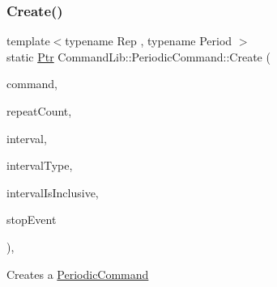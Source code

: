 \subsubsection{\texorpdfstring{Create()}{Create()}\hspace{0.1cm}{\footnotesize\ttfamily [3/4]}}
{\footnotesize\ttfamily template$<$typename Rep , typename Period $>$ \\
static \mbox{\hyperlink{class_command_lib_1_1_command_a3b3e4f00144373299df5c6bb1acc319d}{Ptr}} Command\+Lib\+::\+Periodic\+Command\+::\+Create (\begin{DoxyParamCaption}\item[{\mbox{\hyperlink{class_command_lib_1_1_command_a3b3e4f00144373299df5c6bb1acc319d}{Command\+::\+Ptr}}}]{command,  }\item[{size\+\_\+t}]{repeat\+Count,  }\item[{std\+::chrono\+::duration$<$ Rep, Period $>$}]{interval,  }\item[{\mbox{\hyperlink{class_command_lib_1_1_periodic_command_ac32ef93cf679cd652da30a0ad373d31e}{Interval\+Type}}}]{interval\+Type,  }\item[{bool}]{interval\+Is\+Inclusive,  }\item[{\mbox{\hyperlink{class_command_lib_1_1_waitable_ac74b6b91e48220146eada76a31cf2d9b}{Waitable\+::\+Ptr}}}]{stop\+Event }\end{DoxyParamCaption})\hspace{0.3cm}{\ttfamily [inline]}, {\ttfamily [static]}}



Creates a \mbox{\hyperlink{class_command_lib_1_1_periodic_command}{Periodic\+Command}} 



